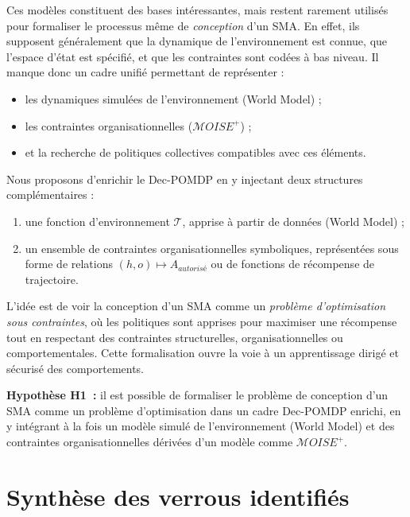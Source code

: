 \noindent
Ces modèles constituent des bases intéressantes, mais restent rarement utilisés pour formaliser le processus même de \textit{conception} d'un \ac{SMA}. En effet, ils supposent généralement que la dynamique de l'environnement est connue, que l'espace d'état est spécifié, et que les contraintes sont codées à bas niveau. Il manque donc un cadre unifié permettant de représenter :
\begin{itemize}
    \item les dynamiques simulées de l'environnement (World Model) ;
    \item les contraintes organisationnelles ($\mathcal{M}OISE^+$) ;
    \item et la recherche de politiques collectives compatibles avec ces éléments.
\end{itemize}

\medskip

\noindent
Nous proposons d'enrichir le \ac{Dec-POMDP} en y injectant deux structures complémentaires :
\begin{enumerate}
    \item une fonction d'environnement $\mathcal{T}$, apprise à partir de données (World Model) ;
    \item un ensemble de contraintes organisationnelles symboliques, représentées sous forme de relations $(h, o) \mapsto A_{autorisé}$ ou de fonctions de récompense de trajectoire.
\end{enumerate}

\noindent
L'idée est de voir la conception d'un \ac{SMA} comme un \textit{problème d'optimisation sous contraintes}, où les politiques sont apprises pour maximiser une récompense tout en respectant des contraintes structurelles, organisationnelles ou comportementales. Cette formalisation ouvre la voie à un apprentissage dirigé et sécurisé des comportements.

\medskip

\noindent
\textbf{Hypothèse H1~:} il est possible de formaliser le problème de conception d'un \ac{SMA} comme un problème d'optimisation dans un cadre \ac{Dec-POMDP} enrichi, en y intégrant à la fois un modèle simulé de l'environnement (World Model) et des contraintes organisationnelles dérivées d'un modèle comme $\mathcal{M}OISE^+$.

\section*{Synthèse des verrous identifiés}

